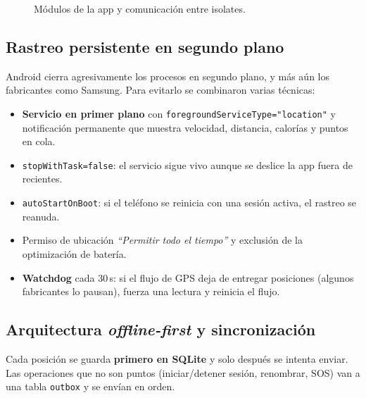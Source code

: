 \documentclass[11pt]{article}
\begin{document}
\begin{figure}[!htbp]
\caption{Módulos de la app y comunicación entre isolates.}
\end{figure}

\subsection{Rastreo persistente en segundo plano}
Android cierra agresivamente los procesos en segundo plano, y más aún los fabricantes como Samsung. Para
evitarlo se combinaron varias técnicas:
\begin{itemize}
  \item \textbf{Servicio en primer plano} con \texttt{foregroundServiceType="location"} y notificación
        permanente que muestra velocidad, distancia, calorías y puntos en cola.
  \item \texttt{stopWithTask=false}: el servicio sigue vivo aunque se deslice la app fuera de recientes.
  \item \texttt{autoStartOnBoot}: si el teléfono se reinicia con una sesión activa, el rastreo se reanuda.
  \item Permiso de ubicación \emph{``Permitir todo el tiempo''} y exclusión de la optimización de batería.
  \item \textbf{Watchdog} cada 30\,s: si el flujo de GPS deja de entregar posiciones (algunos fabricantes lo
        pausan), fuerza una lectura y reinicia el flujo.
\end{itemize}

\subsection{Arquitectura \emph{offline-first} y sincronización}

Cada posición se guarda \textbf{primero en SQLite} y solo después se intenta enviar. Las operaciones que no
son puntos (iniciar/detener sesión, renombrar, SOS) van a una tabla \texttt{outbox} y se envían en orden.
\end{document}
